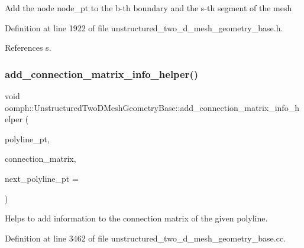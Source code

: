 Add the node node\+\_\+pt to the b-\/th boundary and the s-\/th segment of the mesh 

Definition at line 1922 of file unstructured\+\_\+two\+\_\+d\+\_\+mesh\+\_\+geometry\+\_\+base.\+h.



References s.

\mbox{\label{classoomph_1_1UnstructuredTwoDMeshGeometryBase_ae05fb2391856e555435632c64fa63f08}} 
\subsubsection{\texorpdfstring{add\+\_\+connection\+\_\+matrix\+\_\+info\+\_\+helper()}{add\_connection\_matrix\_info\_helper()}}
{\footnotesize\ttfamily void oomph\+::\+Unstructured\+Two\+D\+Mesh\+Geometry\+Base\+::add\+\_\+connection\+\_\+matrix\+\_\+info\+\_\+helper (\begin{DoxyParamCaption}\item[{\hyperlink{classoomph_1_1TriangleMeshPolyLine}{Triangle\+Mesh\+Poly\+Line} $\ast$}]{polyline\+\_\+pt,  }\item[{std\+::map$<$ unsigned, std\+::map$<$ unsigned, \hyperlink{classoomph_1_1Vector}{Vector}$<$ \hyperlink{structoomph_1_1UnstructuredTwoDMeshGeometryBase_1_1vertex__connection__info}{vertex\+\_\+connection\+\_\+info} $>$ $>$ $>$ \&}]{connection\+\_\+matrix,  }\item[{\hyperlink{classoomph_1_1TriangleMeshPolyLine}{Triangle\+Mesh\+Poly\+Line} $\ast$}]{next\+\_\+polyline\+\_\+pt = {} }\end{DoxyParamCaption})\hspace{0.3cm}{\ttfamily [protected]}}



Helps to add information to the connection matrix of the given polyline. 



Definition at line 3462 of file unstructured\+\_\+two\+\_\+d\+\_\+mesh\+\_\+geometry\+\_\+base.\+cc.



